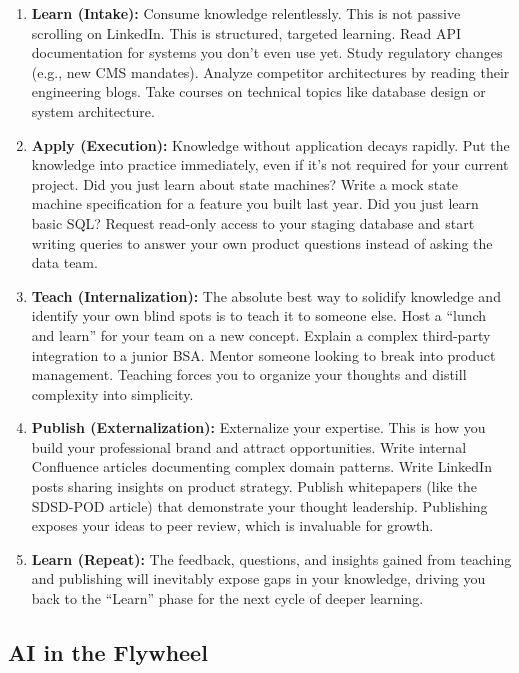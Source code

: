 \documentclass[
  11pt,
  openany,
  oneside]{book}
\providecommand{\tightlist}{%
  \setlength{\itemsep}{0pt}\setlength{\parskip}{0pt}}
\begin{document}
\begin{enumerate}
\def\labelenumi{\arabic{enumi}.}
\tightlist
\item
  \textbf{Learn (Intake):} Consume knowledge relentlessly. This is not
  passive scrolling on LinkedIn. This is structured, targeted learning.
  Read API documentation for systems you don't even use yet. Study
  regulatory changes (e.g., new CMS mandates). Analyze competitor
  architectures by reading their engineering blogs. Take courses on
  technical topics like database design or system architecture.
\item
  \textbf{Apply (Execution):} Knowledge without application decays
  rapidly. Put the knowledge into practice immediately, even if it's not
  required for your current project. Did you just learn about state
  machines? Write a mock state machine specification for a feature you
  built last year. Did you just learn basic SQL? Request read-only
  access to your staging database and start writing queries to answer
  your own product questions instead of asking the data team.
\item
  \textbf{Teach (Internalization):} The absolute best way to solidify
  knowledge and identify your own blind spots is to teach it to someone
  else. Host a ``lunch and learn'' for your team on a new concept.
  Explain a complex third-party integration to a junior BSA. Mentor
  someone looking to break into product management. Teaching forces you
  to organize your thoughts and distill complexity into simplicity.
\item
  \textbf{Publish (Externalization):} Externalize your expertise. This
  is how you build your professional brand and attract opportunities.
  Write internal Confluence articles documenting complex domain
  patterns. Write LinkedIn posts sharing insights on product strategy.
  Publish whitepapers (like the SDSD-POD article) that demonstrate your
  thought leadership. Publishing exposes your ideas to peer review,
  which is invaluable for growth.
\item
  \textbf{Learn (Repeat):} The feedback, questions, and insights gained
  from teaching and publishing will inevitably expose gaps in your
  knowledge, driving you back to the ``Learn'' phase for the next cycle
  of deeper learning.
\end{enumerate}

\subsection{AI in the Flywheel}\label{ai-in-the-flywheel}
\end{document}
